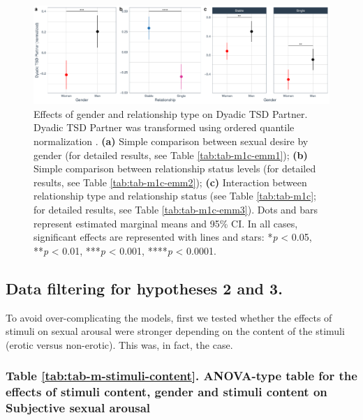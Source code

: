 \documentclass[
  bookmarksnumbered]{article}
\begin{document}
\begin{figure}
\centering
\includegraphics{Sexual_Desire_Arousal_files/figure-latex/fig-h1c-1.pdf}
\caption{\label{fig:fig-h1c}Effects of gender and relationship type on Dyadic TSD Partner. Dyadic TSD Partner was transformed using ordered quantile normalization \autocite{petersonOrderedQuantileNormalization2020a}. \textbf{(a)} Simple comparison between sexual desire by gender (for detailed results, see Table \ref{tab:tab-m1c-emm1}); \textbf{(b)} Simple comparison between relationship status levels (for detailed results, see Table \ref{tab:tab-m1c-emm2}); \textbf{(c)} Interaction between relationship type and relationship status (see Table \ref{tab:tab-m1c}; for detailed results, see Table \ref{tab:tab-m1c-emm3}). Dots and bars represent estimated marginal means and 95\% CI. In all cases, significant effects are represented with lines and stars: *\emph{p} \textless{} 0.05, **\emph{p} \textless{} 0.01, ***\emph{p} \textless{} 0.001, ****\emph{p} \textless{} 0.0001.}
\end{figure}

\subsection{Data filtering for hypotheses 2 and 3.}\label{datfil2and3}

To avoid over-complicating the models, first we tested whether the effects of stimuli on sexual arousal were stronger depending on the content of the stimuli (erotic versus non-erotic). This was, in fact, the case.

\subsubsection{Table \ref{tab:tab-m-stimuli-content}. ANOVA-type table for the effects of stimuli content, gender and stimuli content on Subjective sexual arousal}\label{table-reftabtab-m-stimuli-content.-anova-type-table-for-the-effects-of-stimuli-content-gender-and-stimuli-content-on-subjective-sexual-arousal}
\end{document}
